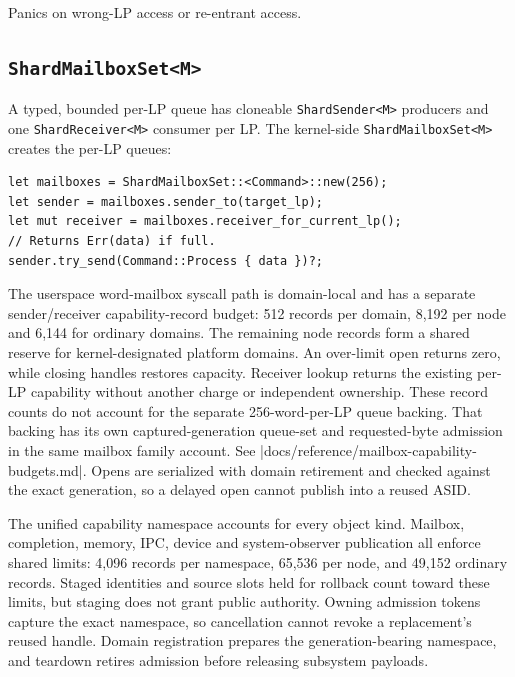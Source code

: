 Panics on wrong-LP access or re-entrant access.

\subsection{\texttt{ShardMailboxSet<M>}}

A typed, bounded per-LP queue has cloneable \texttt{ShardSender<M>} producers and
one \texttt{ShardReceiver<M>} consumer per LP. The kernel-side
\texttt{ShardMailboxSet<M>} creates the per-LP queues:

\begin{lstlisting}[style=rustCode]
let mailboxes = ShardMailboxSet::<Command>::new(256);
let sender = mailboxes.sender_to(target_lp);
let mut receiver = mailboxes.receiver_for_current_lp();
// Returns Err(data) if full.
sender.try_send(Command::Process { data })?;
\end{lstlisting}

The userspace word-mailbox syscall path is domain-local and has a separate
sender/receiver capability-record budget: 512 records per domain, 8,192 per
node and 6,144 for ordinary domains. The remaining node records form a shared
reserve for kernel-designated platform domains. An over-limit open returns
zero, while closing handles restores capacity. Receiver lookup returns the existing
per-LP capability without another charge or independent ownership. These
record counts do not account for the separate 256-word-per-LP queue backing.
That backing has its own captured-generation queue-set and requested-byte
admission in the same mailbox family account. See
\repofile|docs/reference/mailbox-capability-budgets.md|.
Opens are serialized with domain retirement and checked against the exact
generation, so a delayed open cannot publish into a reused ASID.

The unified capability namespace accounts for every object kind. Mailbox,
completion, memory, IPC, device and system-observer publication all enforce
shared limits:
4,096 records per namespace, 65,536 per node, and 49,152 ordinary records.
Staged identities and source slots held for rollback count toward these limits, but
staging does not grant public authority. Owning admission tokens capture the
exact namespace, so cancellation cannot revoke a replacement's reused handle.
Domain registration prepares the generation-bearing namespace, and teardown
retires admission before releasing subsystem payloads.

